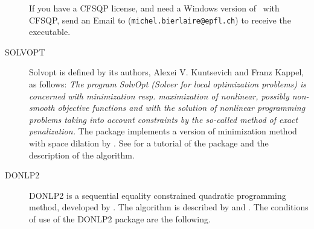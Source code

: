 \documentclass[12pt]{memoir}
\begin{document}
\begin{description}
         If you have a CFSQP license, and need a Windows version of \BIOGEME\ with CFSQP, send
         an Email to \linebreak (\texttt{michel.bierlaire@epfl.ch}) 
         to receive the executable.

      \item[SOLVOPT\index{Algorithm!SOLVOPT}] Solvopt is defined by its authors, Alexei V. Kuntsevich and
         Franz Kappel, as follows: \emph{The program SolvOpt (Solver for local
         optimization problems) is concerned with minimization resp. maximization of
         nonlinear, possibly non-smooth objective functions and with the solution of
         nonlinear programming problems taking into account constraints by the
         so-called method of exact penalization.} The package implements a version of
         minimization method with space dilation by . See
          for a tutorial of
         the package and the description of the algorithm.
      \item[DONLP2\index{Algorithm!DONLP2}] DONLP2 is a sequential equality constrained quadratic
         programming method, developed by . The algorithm is
         described by  and . The conditions of
         use of the DONLP2 package are the following.


\end{description}
\end{document}

